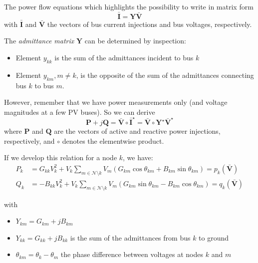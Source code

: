 \begin{frame}[allowframebreaks]{The power flow equations}
    which highlights the possibility to write in matrix form
    \begin{equation}
        \mathbf{\bar{I}} = \mathbf{Y} \mathbf{\bar{V}} \label{eq:bus_inj_mat}
    \end{equation}
    with $\mathbf{\bar{I}}$ and $\mathbf{\bar{V}}$ the vectors of bus current injections and bus voltages, respectively.
    
    \newpage
    The \textit{admittance matrix} $\mathbf{Y}$ can be determined by inspection:
    \begin{itemize}
        \item Element $y_{kk}$ is the sum of the admittances incident to bus $k$
        \item Element $y_{km}, m \neq k$, is the opposite of the sum of the admittances connecting bus $k$ to bus $m$.
    \end{itemize}

    However, remember that we have power measurements only (and voltage magnitudes at a few PV buses). So we can derive
    \begin{equation}
        \mathbf{P} +j \mathbf{Q} = \mathbf{\bar{V}} \circ \mathbf{\bar{I}}^{\star}
        = \mathbf{\bar{V}} \circ \mathbf{Y}^{\star} \mathbf{\bar{V}}^{\star} \label{eq:pf}
    \end{equation}
    where $\mathbf{P}$ and $\mathbf{Q}$ are the vectors of active and reactive power injections, respectively, and $\circ$ denotes the elementwise product.
    
    If we develop this relation for a node $k$, we have:
    \begin{align}
        P_k &= G_{kk} V_k^2  + V_k \sum_{m \in \mathcal{N} \setminus k} V_m(G_{km} \cos\theta_{km} + B_{km} \sin\theta_{km}) = p_k(\mathbf{\bar{V}}) \label{eq:pf_P}\\
        Q_k &= -B_{kk} V_k^2 + V_k \sum_{m \in \mathcal{N} \setminus k} V_m(G_{km} \sin\theta_{km} - B_{km} \cos\theta_{km}) = q_k(\mathbf{\bar{V}}) \label{eq:pf_Q}
    \end{align}
   
    with
    \begin{itemize}
        \item $Y_{km} = G_{km} + j B_{km}$
        \item $Y_{kk} = G_{kk} + j B_{kk}$ is the sum of the admittances from bus $k$ to ground
        \item $\theta_{km} = \theta_{k} - \theta_{m}$ the phase difference between voltages at nodes $k$ and $m$
    \end{itemize}
\end{frame}

